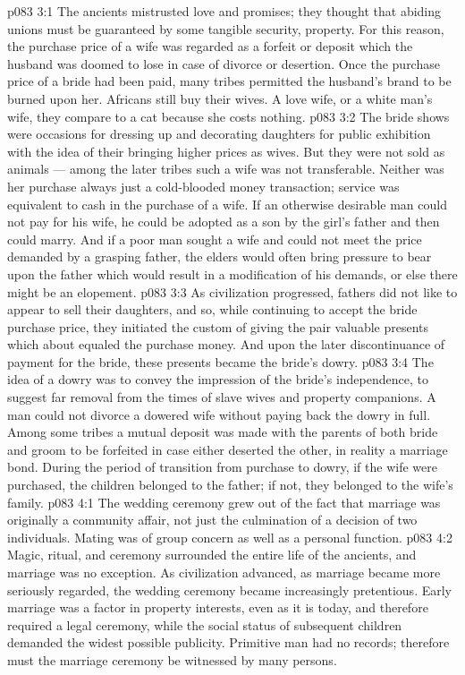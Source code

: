 \vs p083 3:1 The ancients mistrusted love and promises; they thought that abiding unions must be guaranteed by some tangible security, property. For this reason, the purchase price of a wife was regarded as a forfeit or deposit which the husband was doomed to lose in case of divorce or desertion. Once the purchase price of a bride had been paid, many tribes permitted the husband’s brand to be burned upon her. Africans still buy their wives. A love wife, or a white man’s wife, they compare to a cat because she costs nothing.
\vs p083 3:2 The bride shows were occasions for dressing up and decorating daughters for public exhibition with the idea of their bringing higher prices as wives. But they were not sold as animals --- among the later tribes such a wife was not transferable. Neither was her purchase always just a cold\hyp{}blooded money transaction; service was equivalent to cash in the purchase of a wife. If an otherwise desirable man could not pay for his wife, he could be adopted as a son by the girl’s father and then could marry. And if a poor man sought a wife and could not meet the price demanded by a grasping father, the elders would often bring pressure to bear upon the father which would result in a modification of his demands, or else there might be an elopement.
\vs p083 3:3 As civilization progressed, fathers did not like to appear to sell their daughters, and so, while continuing to accept the bride purchase price, they initiated the custom of giving the pair valuable presents which about equaled the purchase money. And upon the later discontinuance of payment for the bride, these presents became the bride’s dowry.
\vs p083 3:4 The idea of a dowry was to convey the impression of the bride’s independence, to suggest far removal from the times of slave wives and property companions. A man could not divorce a dowered wife without paying back the dowry in full. Among some tribes a mutual deposit was made with the parents of both bride and groom to be forfeited in case either deserted the other, in reality a marriage bond. During the period of transition from purchase to dowry, if the wife were purchased, the children belonged to the father; if not, they belonged to the wife’s family.
\vs p083 4:1 The wedding ceremony grew out of the fact that marriage was originally a community affair, not just the culmination of a decision of two individuals. Mating was of group concern as well as a personal function.
\vs p083 4:2 \pc Magic, ritual, and ceremony surrounded the entire life of the ancients, and marriage was no exception. As civilization advanced, as marriage became more seriously regarded, the wedding ceremony became increasingly pretentious. Early marriage was a factor in property interests, even as it is today, and therefore required a legal ceremony, while the social status of subsequent children demanded the widest possible publicity. Primitive man had no records; therefore must the marriage ceremony be witnessed by many persons.
